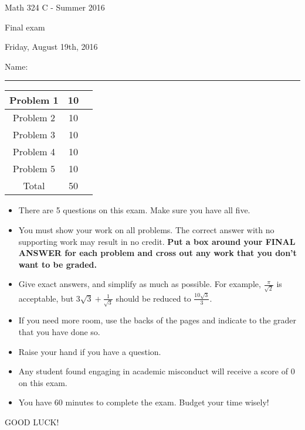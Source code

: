 \documentclass[12 pt]{report}
\begin{document}
\noindent \vfill \noindent \large

\centerline{Math 324 C  - Summer 2016}

\centerline{Final exam}

\centerline{Friday, August 19th, 2016}

\normalsize

\vfill
\medskip
Name: \rule{10cm}{1pt}

\bigskip

\vfill
\begin{center}
{\large
\begin{tabular}{||c|c|r||}
\hline Problem 1 & 10 & \hspace{10mm} \hfill \\
\hline Problem 2 & 10  & \hspace{10mm} \hfill \\
\hline Problem 3 & 10 & \hspace{10mm} \hfill \\
\hline Problem 4 & 10  & \hspace{10mm} \hfill \\
\hline Problem 5 & 10  & \hspace{10mm} \hfill \\
\hline Total & 50 & \hspace{10mm} \hfill \\
\hline
\end{tabular}
}
\end{center}
\vfill
\begin{itemize}
\item There are 5 questions on this exam. Make sure you have all five.
\item You must show your work on all problems.  The correct answer
with no supporting work may result in no credit. \textbf{Put a box
around your FINAL ANSWER for each problem and cross out any work
that you don't want to be graded.} 
\item Give exact answers, and simplify as much as possible. 
For example, $\frac{\pi}{\sqrt{2}}$ is acceptable, but $3\sqrt{3}+\frac{1}{\sqrt{3}}$
should be reduced to $\frac{10\sqrt{3}}{3}$.   

\item If you need more room, use the backs
of the pages and indicate to the grader that you have done so.
\item Raise your hand if you have a question.
\item Any student found engaging in academic misconduct will receive
a score of 0 on this exam.
\item You have 60 minutes to complete the exam.  Budget your time wisely! \\
\end{itemize}
\vfill
\begin{center}GOOD LUCK!\end{center}
\end{document}
